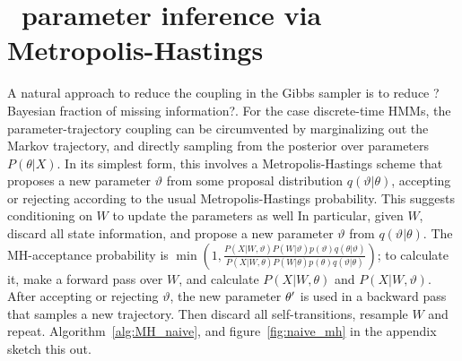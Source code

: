 \section{\Naive\ parameter inference via Metropolis-Hastings}
A natural approach to reduce the coupling in the Gibbs sampler is to reduce ?Bayesian fraction of missing information?. 
For the case discrete-time HMMs, the parameter-trajectory coupling can be circumvented by marginalizing out the Markov trajectory, 
and directly sampling from the posterior over parameters $P(\theta|X)$.
In its simplest form, this involves a Metropolis-Hastings scheme that proposes a new parameter $\vartheta$ from some proposal distribution 
$q(\vartheta|\theta)$, accepting or rejecting according to the usual
Metropolis-Hastings probability.
This suggests conditioning on $W$ to update the parameters as well
In particular, given $W$, discard all state information, and propose a 
new parameter $\vartheta$ from $q(\vartheta|\theta)$. 
The MH-acceptance probability is $\min\left(1,
\frac{P(X|W,\vartheta)P(W|\vartheta)p(\vartheta)q(\theta|\vartheta)}
     {P(X|W,\theta)P(W|\theta)p(\theta)q(\vartheta|\theta)}\right)$; 
     to calculate it,
make a forward pass over $W$, and calculate 
$P(X|W,\theta)$ and $P(X|W,\vartheta)$. %
After accepting or rejecting $\vartheta$, the new parameter $\theta'$ is used in
a backward pass that samples a new trajectory. Then discard all 
self-transitions, resample $W$ and repeat. Algorithm~\ref{alg:MH_naive}, and 
figure~\ref{fig:naive_mh} in the appendix sketch this out.

